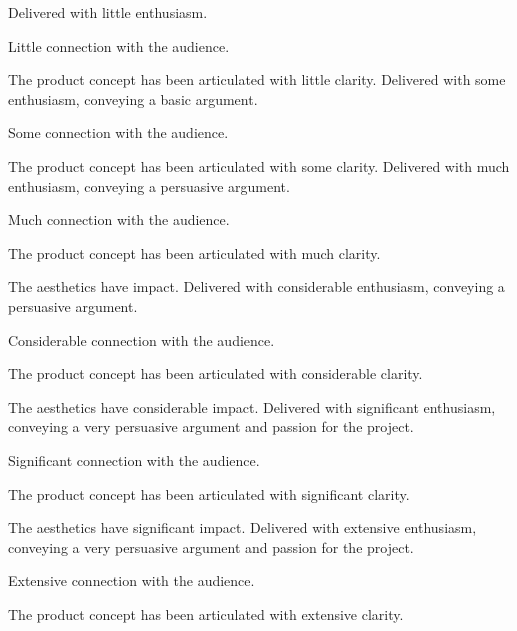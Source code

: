 \documentclass{../fal_assignment}
\begin{document}
\begin{markingrubric}
%
        \grade \fail Delivered with little enthusiasm. 
            \par Little connection with the audience.
            \par The product concept has been articulated with little clarity.
        \grade Delivered with some enthusiasm, conveying a basic argument. 
            \par Some connection with the audience.
            \par The product concept has been articulated with some clarity.
        \grade Delivered with much enthusiasm, conveying a persuasive argument. 
            \par Much connection with the audience.
            \par The product concept has been articulated with much clarity.
            \par The aesthetics have impact.
        \grade Delivered with considerable enthusiasm, conveying a persuasive argument. 
            \par Considerable connection with the audience.
            \par The product concept has been articulated with considerable clarity.
            \par The aesthetics have considerable impact.
        \grade Delivered with significant enthusiasm, conveying a very persuasive argument and passion for the project.
            \par Significant connection with the audience.
            \par The product concept has been articulated with significant clarity.
            \par The aesthetics have significant impact.
        \grade Delivered with extensive enthusiasm, conveying a very persuasive argument and passion for the project.
            \par Extensive connection with the audience.
            \par The product concept has been articulated with extensive clarity.

\end{markingrubric}
\end{document}
